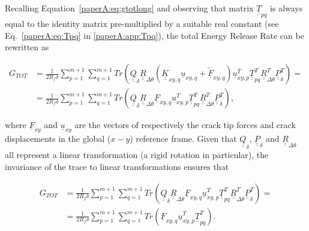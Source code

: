 Recalling Equation~\ref{paperA:eq:gtotlong} and observing that matrix $\underline{\underline{T}}_{pq}$ is always equal to the identity matrix pre-multiplied by a suitable real constant (see Eq.~\ref{paperA:eq:Tpq} in \ref{paperA:app:Tpq}), the total Energy Release Rate can be rewritten as

\begin{equation}\label{paperA:eq:gtotlong1}
\begin{split}
G_{TOT}&=\frac{1}{2R_{f}\delta}\sum_{p=1}^{m+1}\sum_{q=1}^{m+1}Tr\left(\underline{\underline{Q}}_{\delta}\underline{\underline{R}}_{\Delta\theta}\left(\underline{\underline{K}}_{xy,q}\underline{u}_{xy,q}+\underline{\widetilde{F}}_{xy,q}\right)\underline{u}_{xy,p}^{T}\underline{\underline{T}}_{pq}^{T}\underline{\underline{R}}_{\Delta\theta}^{T}\underline{\underline{P}}_{\delta}^{T}\right)=\\
&=\frac{1}{2R_{f}\delta}\sum_{p=1}^{m+1}\sum_{q=1}^{m+1}Tr\left(\underline{\underline{Q}}_{\delta}\underline{\underline{R}}_{\Delta\theta}\underline{F}_{xy,q}\underline{u}_{xy,p}^{T}\underline{\underline{T}}_{pq}^{T}\underline{\underline{R}}_{\Delta\theta}^{T}\underline{\underline{P}}_{\delta}^{T}\right),
\end{split}
\end{equation}

where $\underline{F}_{xy}$ and $\underline{u}_{xy}$ are the vectors of respectively the crack tip forces and crack displacements in the global ($x-y$) reference frame. Given that $\underline{\underline{Q}}_{\delta}$, $\underline{\underline{P}}_{\delta}$ and $\underline{\underline{R}}_{\Delta\theta}$ all represent a linear transformation (a rigid rotation in particular), the invariance of the trace to linear transformations ensures that

\begin{equation}\label{paperA:eq:gtotlong2}
\begin{split}
G_{TOT}&=\frac{1}{2R_{f}\delta}\sum_{p=1}^{m+1}\sum_{q=1}^{m+1}Tr\left(\underline{\underline{Q}}_{\delta}\underline{\underline{R}}_{\Delta\theta}\underline{F}_{xy,q}\underline{u}_{xy,p}^{T}\underline{\underline{T}}_{pq}^{T}\underline{\underline{R}}_{\Delta\theta}^{T}\underline{\underline{P}}_{\delta}^{T}\right)=\\
&=\frac{1}{2R_{f}\delta}\sum_{p=1}^{m+1}\sum_{q=1}^{m+1}Tr\left(\underline{F}_{xy,q}\underline{u}_{xy,p}^{T}\underline{\underline{T}}_{pq}^{T}\right).
\end{split}
\end{equation}

